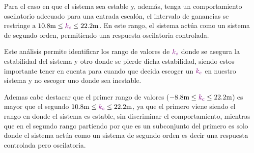 Para el caso en que el sistema sea estable y, además, tenga un comportamiento oscilatorio adecuado para una entrada escalón, el intervalo de ganancias se restringe a \( 10.8 \text{m} \leq \mathbin{\color{violet}k_{c}} \leq 22.2 \text{m} \). En este rango, el sistema actúa como un sistema de segundo orden, permitiendo una respuesta oscilatoria controlada.

Este análisis permite identificar los rango de valores de \(\mathbin{\color{violet}k_c}\) 
donde se asegura la estabilidad del sistema y otro donde se pierde dicha estabilidad, siendo estos importante tener en cuenta para cuando que decida escoger un \(\mathbin{\color{violet}k_c}\) en nuestro sistema y no escoger uno donde sea inestable.


Ademas cabe destacar que el primer rango de valores (\( -8.8 \text{m} \leq \mathbin{\color{violet}k_c} \leq 22.2 \text{m} \)) es mayor que el segundo \( 10.8 \text{m} \leq \mathbin{\color{violet}k_{c}} \leq 22.2 \text{m} \), ya que el primero viene siendo el rango en donde el sistema es estable, sin discriminar el comportamiento, mientras que en el segundo rango partiendo por que es un subconjunto del primero es solo donde el sistema actúa como un sistema de segundo orden es decir una respuesta controlada pero oscilatoria.
